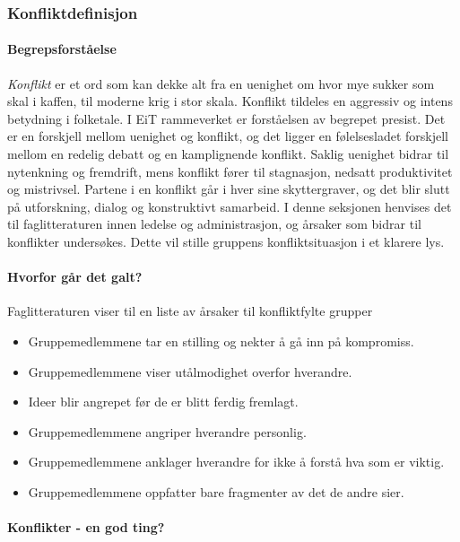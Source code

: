 \subsubsection{Konfliktdefinisjon}

\paragraph{Begrepsforståelse}

\emph{Konflikt} er et ord som kan dekke alt fra en uenighet om hvor mye sukker som skal i kaffen, til moderne krig i stor skala. 
Konflikt tildeles en aggressiv og intens betydning i folketale.
I EiT rammeverket er forståelsen av begrepet presist.
Det er en forskjell mellom uenighet og konflikt, og det ligger en følelsesladet forskjell mellom en redelig debatt og en kamplignende konflikt.
Saklig uenighet bidrar til nytenkning og fremdrift, mens konflikt fører til stagnasjon, nedsatt produktivitet og mistrivsel\cite{ledernytt}.
Partene i en konflikt går i hver sine skyttergraver, og det blir slutt på utforskning, dialog og konstruktivt samarbeid.
I denne seksjonen henvises det til faglitteraturen innen ledelse og administrasjon, og årsaker som bidrar til konflikter undersøkes.
Dette vil stille gruppens konfliktsituasjon i et klarere lys. 
\\
\paragraph{Hvorfor går det galt?}

Faglitteraturen viser til en liste av årsaker til konfliktfylte grupper\cite[p.~253]{orgorg}
\begin{itemize}
  \item Gruppemedlemmene tar en stilling og nekter å gå inn på kompromiss.
  \item Gruppemedlemmene viser utålmodighet overfor hverandre.  
  \item Ideer blir angrepet før de er blitt ferdig fremlagt.
  \item Gruppemedlemmene angriper hverandre personlig.
  \item Gruppemedlemmene anklager hverandre for ikke å forstå hva som er viktig.
  \item Gruppemedlemmene oppfatter bare fragmenter av det de andre sier.  
\end{itemize}

\paragraph{Konflikter - en god ting?}

